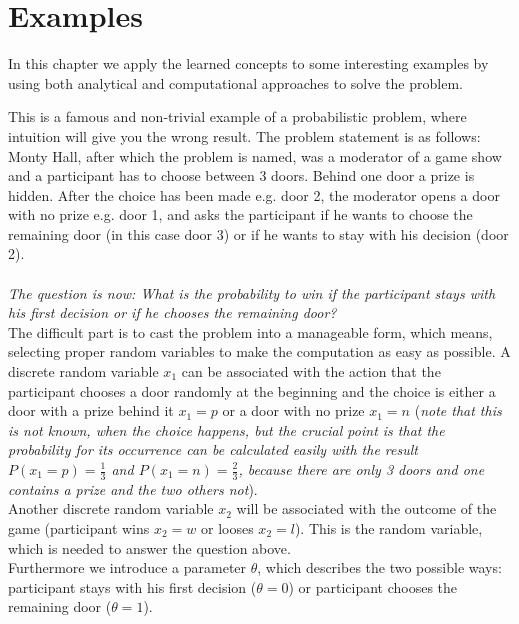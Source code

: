 \documentclass{tstextbook}
\begin{document}
\section{Examples}

In this chapter we apply the learned concepts to some interesting examples by using both analytical and computational approaches to solve the problem.

\begin{example}

This is a famous and non-trivial example of a probabilistic problem, where intuition will give you the wrong result. The problem statement is as follows:\\

Monty Hall, after which the problem is named, was a moderator of a game show and a participant has to choose between 3 doors. Behind one door a prize is hidden. After the choice has been made e.g. door 2, the moderator opens a door with no prize e.g. door 1, and asks the participant if he wants to choose the remaining door (in this case door 3) or if he wants to stay with his decision (door 2).
\\
\\
\textit{The question is now: What is the probability to win if the participant stays with his first decision or if he chooses the remaining door?}\\

The difficult part is to cast the problem into a manageable form, which means, selecting proper random variables to make the computation as easy as possible. 
A discrete random variable $x_1$ can be associated with the action that the participant chooses a door randomly at the beginning and the choice is either a door with a prize behind it $x_1=p$ or a door with no prize $x_1=n$ (\textit{note that this is not known, when the choice happens, but the crucial point is that the probability for its occurrence can be calculated easily with the result $P(x_1=p)=\frac{1}{3}$ and $P(x_1=n)=\frac{2}{3}$, because there are only 3 doors and one contains a prize and the two others not}).\\ 

Another discrete random variable $x_2$ will be associated with the outcome of the game (participant wins $x_2=w$ or looses $x_2=l$). This is the random variable, which is needed to answer the question above.\\
 
Furthermore we introduce a parameter $\theta$, which describes the two possible ways: participant stays with his first decision ($\theta=0$) or participant chooses the remaining door ($\theta=1$).\\


\end{example}
\end{document}
